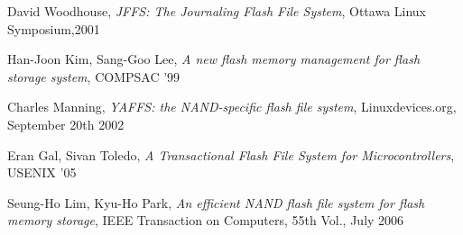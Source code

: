 \documentclass[conference]{IEEEtran}
\begin{document}

%
%
%
\begin{thebibliography}{1}

David Woodhouse, \emph{JFFS: The Journaling Flash File System},
Ottawa Linux Symposium,2001

Han-Joon Kim, Sang-Goo Lee, \emph{A new flash memory management
for flash storage system}, COMPSAC '99

Charles Manning, \emph{YAFFS: the NAND-specific flash file system},
Linuxdevices.org, September 20th 2002

Eran Gal, Sivan Toledo, \emph{A Transactional Flash File System for
Microcontrollers}, USENIX '05

Seung-Ho Lim, Kyu-Ho Park, \emph{An efficient NAND flash file
system for flash memory storage}, IEEE Transaction on Computers, 55th Vol.,
July 2006

\end{thebibliography}




\end{document}
